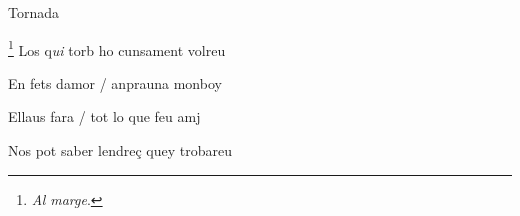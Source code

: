 \documentclass[12pt]{article}
\begin{document}
\begin{estrofaExtra}%




\begin{tornada}

Tornada

\end{tornada}


\end{estrofaExtra}


\begin{estrofa}

 \footnote{\textit{Al marge}.} Los q\textit{ui} torb ho cunsament
volreu

 En fets damor / anprauna monboy

 Ellaus fara / tot lo que feu amj

 Nos pot saber lendre\c{c} quey trobareu

\end{estrofa}
\end{document}
